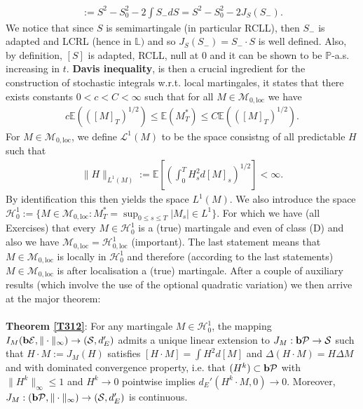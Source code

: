 \documentclass[12pt,a4paper, twoside]{article}
\theoremstyle{definition}
\newcommand{\EE}{\mathbb{E}} %
\newcommand{\PP}{\mathbb{P}} %
\newcommand{\simple}{\textbf{\text{b}}\mathcal{E}}
\newcommand{\pred}{\textbf{\text{b}}\mathcal{P}}
\begin{document}
\begin{align*}
[S]:= S^2-S_0^2-2 \int S_-dS=S^2-S_0^2-2J_S(S_-).
\end{align*}
We notice that since $S$ is semimartingale (in particular RCLL), then $S_-$ is adapted and LCRL (hence in $\mathbb{L})$ and so $J_S(S_-)=S_- \cdot S$ is well defined. Also, by definition,  $[S]$ is adapted, RCLL, null at $0$ and it can be shown to be $\PP$-a.s. increasing in $t$. \textbf{Davis inequality}, is then a crucial ingredient for the construction of stochastic integrals w.r.t. local martingales, it states that there exists constants $0<c<C< \infty$ such that for all $M \in \mathcal{M}_{0, \text{loc}}$ we have
\begin{align*}
c \EE(([M]_T)^{1/2}) \leq \EE(M_T^*) \leq C \EE(([M]_T)^{1/2}).
\end{align*}
\newpage
For $M \in \mathcal{M}_{0, \text{loc}}$, we define $\mathcal{L}^1(M)$ to be the space consistng of all predictable $H$ such that
\begin{align*}
\|H\|_{L^1(M)} := \EE \left[ \left( \int_0^T H_s^2 d[M]_s \right)^{1/2} \right] < \infty.
\end{align*}
By identification this then yields the space $L^1(M)$. We also introduce the space $\mathcal{H}_0^1:= \{ M \in \mathcal{M}_{0, \text{loc}}: M_T^* = \sup_{0 \leq s \leq T} |M_s| \in L^1\}.$ For which we have (all Exercises) that every $M \in \mathcal{H}_0^1$ is a (true) martingale and even of class (D) and also we have $\mathcal{M}_{0, \text{loc}}= \mathcal{H}_{0, \text{loc}}^1$ (important). The last statement means that $M \in \mathcal{M}_{0, \text{loc}}$ is locally in $\mathcal{H}_0^1$ and therefore (according to the last statements)  $M \in \mathcal{M}_{0, \text{loc}}$ is after localisation a (true) martingale. After a couple of auxiliary results (which involve the use of the optional quadratic variation) we then arrive at the major theorem:
\\\\
\textbf{Theorem \ref{T312}}: For any martingale $M \in \mathcal{H}_0^1$, the mapping $I_M( \simple, \| \cdot \|_\infty) \to ( \mathcal{S},  d_E')$ admits a unique linear extension to $J_M: \pred \to \mathcal{S}$ such that $H \cdot M := J_M(H)$ satisfies $[H \cdot M] = \int H^2 d [M]$ and $\Delta (H \cdot M) = H \Delta M$ and with dominated convergence property, i.e. that $(H^k) \subset \pred$ with $\|H^k\|_\infty \leq 1$ and $H^k \to 0$ pointwise implies $d_E'(H^k \cdot M, 0) \to 0$. Moreover, $J_M : ( \pred, \| \cdot \|_\infty) \to ( \mathcal{S}, d_E')$ is continuous. 
\end{document}
